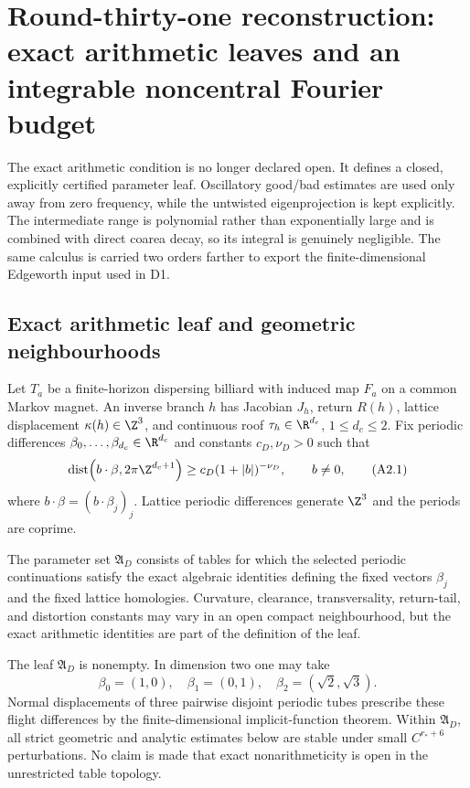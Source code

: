 \section{Round-thirty-one reconstruction: exact arithmetic leaves and an integrable noncentral Fourier budget}
\label{sec:r31-a2}

The exact arithmetic condition is no longer declared open.  It defines a
closed, explicitly certified parameter leaf.  Oscillatory good/bad estimates
are used only away from zero frequency, while the untwisted eigenprojection is
kept explicitly.  The intermediate range is polynomial rather than
exponentially large and is combined with direct coarea decay, so its integral
is genuinely negligible.  The same calculus is carried two orders farther to
export the finite-dimensional Edgeworth input used in D1.

\subsection{Exact arithmetic leaf and geometric neighbourhoods}

Let $T_a$ be a finite-horizon dispersing billiard with induced map $F_a$ on a
common Markov magnet.  An inverse branch $h$ has Jacobian $J_h$, return
$R(h)$, lattice displacement $\kappa(h)\in\Z^3$, and continuous roof
$\tau_h\in\R^{d_c}$, $1\le d_c\le2$.  Fix periodic differences
$\beta_0,\ldots,\beta_{d_c}\in\R^{d_c}$ and constants $c_D,\nu_D>0$ such
that
\[
 \operatorname{dist}\!\left(
 b\cdot\beta,2\pi\Z^{d_c+1}\right)
 \ge c_D(1+|b|)^{-\nu_D},\qquad b\ne0,                   \tag{A2.1}
\]
where $b\cdot\beta=(b\cdot\beta_j)_j$.  Lattice periodic differences generate
$\Z^3$ and the periods are coprime.

\begin{definition}
\label{def:r31-a2-leaf}
The parameter set $\mathfrak A_D$ consists of tables for which the selected
periodic continuations satisfy the exact algebraic identities defining the
fixed vectors $\beta_j$ and the fixed lattice homologies.  Curvature,
clearance, transversality, return-tail, and distortion constants may vary in
an open compact neighbourhood, but the exact arithmetic identities are part
of the definition of the leaf.
\end{definition}

\begin{proposition}
\label{prop:r31-a2-leaf}
The leaf $\mathfrak A_D$ is nonempty.  In dimension two one may take
\[
 \beta_0=(1,0),\quad\beta_1=(0,1),\quad
 \beta_2=(\sqrt2,\sqrt3).                                \tag{A2.2}
\]
Normal displacements of three pairwise disjoint periodic tubes prescribe
these flight differences by the finite-dimensional implicit-function theorem.
Within $\mathfrak A_D$, all strict geometric and analytic estimates below are
stable under small $C^{r_*+6}$ perturbations.  No claim is made that exact
nonarithmeticity is open in the unrestricted table topology.
\end{proposition}

